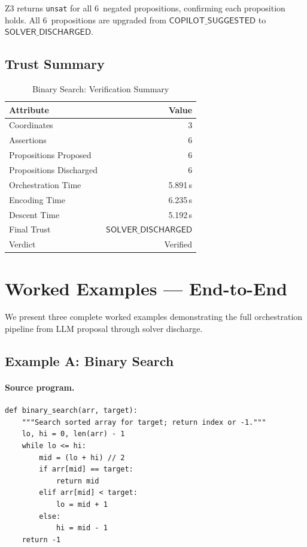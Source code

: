 \documentclass[11pt]{article}
\newcommand{\CopilotSugg}{\ensuremath{\mathsf{COPILOT\_SUGGESTED}}}
\newcommand{\SolverDisch}{\ensuremath{\mathsf{SOLVER\_DISCHARGED}}}
\begin{document}
Z3 returns \texttt{unsat} for all 6~negated propositions, confirming
each proposition holds.  All 6~propositions are upgraded from
$\CopilotSugg$ to $\SolverDisch$.

\subsection{Trust Summary}

\begin{table}[H]
\centering
\caption{Binary Search: Verification Summary}
\label{tab:binary-search-summary}
\begin{tabular}{lr}
\toprule
\textbf{Attribute} & \textbf{Value} \\
\midrule
Coordinates & 3 \\
Assertions & 6 \\
Propositions Proposed & 6 \\
Propositions Discharged & 6 \\
Orchestration Time & 5.891\,s \\
Encoding Time & 6.235\,s \\
Descent Time & 5.192\,s \\
Final Trust & \SolverDisch \\
Verdict & Verified \\
\bottomrule
\end{tabular}
\end{table}

\section{Worked Examples --- End-to-End}\label{sec:worked-examples}

We present three complete worked examples demonstrating the full
orchestration pipeline from LLM proposal through solver discharge.

\subsection{Example A: Binary Search}

\paragraph{Source program.}
\begin{lstlisting}[style=jugeo-python]
def binary_search(arr, target):
    """Search sorted array for target; return index or -1."""
    lo, hi = 0, len(arr) - 1
    while lo <= hi:
        mid = (lo + hi) // 2
        if arr[mid] == target:
            return mid
        elif arr[mid] < target:
            lo = mid + 1
        else:
            hi = mid - 1
    return -1
\end{lstlisting}
\end{document}
